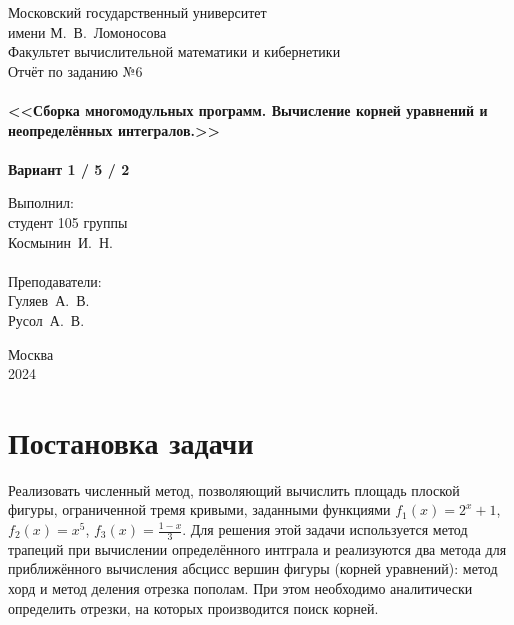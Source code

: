 \documentclass[a4paper,12pt,titlepage,finall]{article}
\begin{document}
\lstset{basicstyle=\ttfamily,breaklines=true, numbers=left}

\begin{titlepage}
    \begin{center}
    {\small \sc Московский государственный университет \\имени М.~В.~Ломоносова\\ Факультет вычислительной математики и кибернетики\\}
    \vfill
    {\large \sc Отчёт по заданию №6}\\~\\
    {\large \bf <<Сборка многомодульных программ. Вычисление корней уравнений и неопределённых интегралов.>>}\\~\\
    {\large \bf Вариант 1 / 5 / 2}
    \end{center}

    \begin{flushright}
    \vfill
    {Выполнил:\\студент 105 группы\\Космынин~И.~Н.\\~\\
    Преподаватели:\\Гуляев~А.~В.\\Русол~А.~В.}
    \end{flushright}

    \begin{center}
    \vfill
    {\small Москва\\2024}
    \end{center}
\end{titlepage}

\tableofcontents
\newpage

\section{Постановка задачи}

Реализовать численный метод, позволяющий вычислить площадь плоской фигуры, ограниченной тремя кривыми, заданными функциями $f_1(x)=2^x+1$, $f_2(x)=x^5$, $f_3(x)=\frac{1-x}{3}$. Для решения этой задачи используется метод трапеций при вычислении определённого интграла и реализуются два метода для приближённого вычисления абсцисс вершин фигуры (корней уравнений): метод хорд и метод деления отрезка пополам. При этом необходимо аналитически определить отрезки, на которых производится поиск корней.\\
\end{document}
